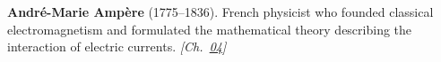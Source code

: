 \textbf{André-Marie Ampère} (1775–1836). French physicist who founded classical electromagnetism and formulated the mathematical theory describing the interaction of electric currents. \emph{[Ch.~\hyperref[ch:energytransmission]{04}]}

